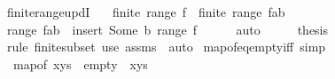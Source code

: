 \begin{isabellebody}
%
\endisadelimproof
\isanewline
{}\isamarkupfalse%
\ finite{\isacharunderscore}{\kern0pt}range{\isacharunderscore}{\kern0pt}updI{\isacharcolon}{\kern0pt}\isanewline
\ \ \ {\isachardoublequoteopen}finite\ {\isacharparenleft}{\kern0pt}range\ f{\isacharparenright}{\kern0pt}{\isachardoublequoteclose}\ \ {\isachardoublequoteopen}finite\ {\isacharparenleft}{\kern0pt}range\ {\isacharparenleft}{\kern0pt}f{\isacharparenleft}{\kern0pt}a{\isasymmapsto}b{\isacharparenright}{\kern0pt}{\isacharparenright}{\kern0pt}{\isacharparenright}{\kern0pt}{\isachardoublequoteclose}\isanewline
%
\isadelimproof
%
\endisadelimproof
%
\isatagproof
{}\isamarkupfalse%
\ {\isacharminus}{\kern0pt}\isanewline
\ \ \isamarkupfalse%
\ {\isachardoublequoteopen}range\ {\isacharparenleft}{\kern0pt}f{\isacharparenleft}{\kern0pt}a{\isasymmapsto}b{\isacharparenright}{\kern0pt}{\isacharparenright}{\kern0pt}\ {\isasymsubseteq}\ insert\ {\isacharparenleft}{\kern0pt}Some\ b{\isacharparenright}{\kern0pt}\ {\isacharparenleft}{\kern0pt}range\ f{\isacharparenright}{\kern0pt}{\isachardoublequoteclose}\isanewline
\ \ \ \ \isamarkupfalse%
\ auto\isanewline
\ \ \isamarkupfalse%
\ \isamarkupfalse%
\ {\isacharquery}{\kern0pt}thesis\isanewline
\ \ \ \ \isamarkupfalse%
\ {\isacharparenleft}{\kern0pt}rule\ finite{\isacharunderscore}{\kern0pt}subset{\isacharparenright}{\kern0pt}\ {\isacharparenleft}{\kern0pt}use\ assms\ \ auto{\isacharparenright}{\kern0pt}\isanewline
{}\isamarkupfalse%
%
\endisatagproof
{\isafoldproof}%
%
\isadelimproof
%
\endisadelimproof
%
\isadelimdocument
%
\endisadelimdocument
%
\isatagdocument
%
\isamarkuptrue%
%
\endisatagdocument
{\isafolddocument}%
%
\isadelimdocument
%
\endisadelimdocument
{}\isamarkupfalse%
\ map{\isacharunderscore}{\kern0pt}of{\isacharunderscore}{\kern0pt}eq{\isacharunderscore}{\kern0pt}empty{\isacharunderscore}{\kern0pt}iff\ {\isacharbrackleft}{\kern0pt}simp{\isacharbrackright}{\kern0pt}{\isacharcolon}{\kern0pt}\isanewline
\ \ {\isachardoublequoteopen}map{\isacharunderscore}{\kern0pt}of\ xys\ {\isacharequal}{\kern0pt}\ empty\ {\isasymlongleftrightarrow}\ xys\ {\isacharequal}{\kern0pt}\ {\isacharbrackleft}{\kern0pt}{\isacharbrackright}{\kern0pt}{\isachardoublequoteclose}\isanewline
%
\isadelimproof
%
\endisadelimproof
%
\isatagproof
{}\isamarkupfalse%
\isanewline
\ \ \isamarkupfalse%

\end{isabellebody}
